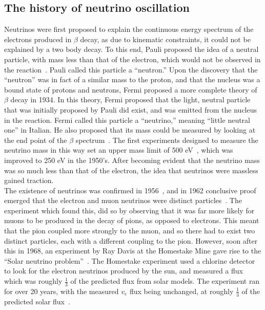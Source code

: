 \subsection{The history of neutrino oscillation} \label{Neut_Hist}
Neutrinos were first proposed to explain the continuous energy spectrum of the electrons produced in $\beta$ decay, as due to kinematic constraints, it could not be explained by a two body decay. To this end, Pauli proposed the idea of a neutral particle, with mass less than that of the electron, which would not be observed in the reaction~\citep{Pauli}. Pauli called this particle a ``neutron.'' Upon the discovery that the ``neutron'' was in fact of a similar mass to the proton, and that the nucleus was a bound state of protons and neutrons, Fermi proposed a more complete theory of $\beta$ decay in 1934. In this theory, Fermi proposed that the light, neutral particle that was initially proposed by Pauli did exist, and was emitted from the nucleus in the reaction. Fermi called this particle a ``neutrino,'' meaning ``little neutral one'' in Italian. He also proposed that its mass could be measured by looking at the end point of the $\beta$ spectrum~\citep{Fermi:1934hr}. The first experiments designed to measure the neutrino mass in this way set an upper mass limit of 500 eV~\citep{NeutMassLim1, NeutMassLim2}, which was improved to 250 eV in the 1950's\citep{NeutMassLim3}. After becoming evident that the neutrino mass was so much less than that of the electron, the idea that neutrinos were massless gained traction. \\

The existence of neutrinos was confirmed in 1956~\citep{Cowan:1992xc}, and in 1962 conclusive proof emerged that the electron and muon neutrinos were distinct particles~\citep{PhysRevLett.9.36}. The experiment which found this, did so by observing that it was far more likely for muons to be produced in the decay of pions, as opposed to electrons. This meant that the pion coupled more strongly to the muon, and so there had to exist two distinct particles, each with a different coupling to the pion. However, soon after this in 1968, an experiment by Ray Davis at the Homestake Mine gave rise to the ``Solar neutrino problem''~\citep{RayDavis1968}. The Homestake experiment used a chlorine detector to look for the electron neutrinos produced by the sun, and measured a flux which was roughly $\frac{1}{3}$ of the predicted flux from solar models. The experiment ran for over 20 years, with the measured $v_{e}$ flux being unchanged, at roughly $\frac{1}{3}$ of the predicted solar flux~\citep{RayDavis1988}. \\

